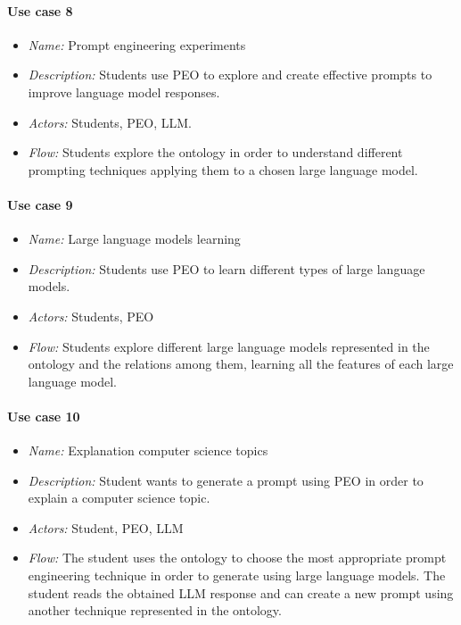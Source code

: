 \paragraph{Use case 8}
\begin{itemize}
    \item \textit{Name:} Prompt engineering experiments
    \item \textit{Description:} Students use PEO to explore and create effective prompts to improve language model responses.
    \item \textit{Actors:} Students, PEO, LLM.
    \item \textit{Flow:} Students explore the ontology in order to understand different prompting techniques applying them to a chosen large language model.
\end{itemize}

\paragraph{Use case 9}
\begin{itemize}
    \item \textit{Name:} Large language models learning
    \item \textit{Description:} Students use PEO to learn different types of large language models.
    \item \textit{Actors:} Students, PEO
    \item \textit{Flow:} Students explore different large language models represented in the ontology and the relations among them, learning all the features of each large language model.
\end{itemize}

\paragraph{Use case 10}
\begin{itemize}
    \item \textit{Name:} Explanation computer science topics
    \item \textit{Description:} Student wants to generate a prompt using PEO in order to explain a computer science topic.
    \item \textit{Actors:} Student, PEO, LLM
    \item \textit{Flow:} The student uses the ontology to choose the most appropriate prompt engineering technique in order to generate using large language models. The student reads the obtained LLM response and can create a new prompt using another technique represented in the ontology.
\end{itemize}

